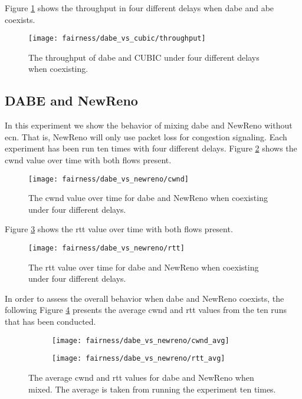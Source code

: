 Figure \ref{fig:dabe_and_cubic_throughput} shows the throughput in four different delays when \gls{dabe} and \gls{abe} coexists.

\begin{figure}[H]
    \centering
    \texttt{[image: fairness/dabe\_vs\_cubic/throughput]}
    \captionsetup{width=1.0\linewidth}
    \caption{The throughput of \gls{dabe} and CUBIC under four different delays when coexisting.}
    \label{fig:dabe_and_cubic_throughput}
\end{figure}






\subsection{DABE and NewReno}

In this experiment we show the behavior of mixing \gls{dabe} and NewReno without \gls{ecn}. That is, NewReno will only use packet loss for congestion signaling. Each experiment has been run ten times with four different delays. Figure \ref{fig:dabe_and_newreno_cwnd} shows the \gls{cwnd} value over time with both flows present.

\begin{figure}[H]
    \centering
    \texttt{[image: fairness/dabe\_vs\_newreno/cwnd]}
    \captionsetup{width=1.0\linewidth}
    \caption{The \gls{cwnd} value over time for \gls{dabe} and NewReno when coexisting under four different delays.}
    \label{fig:dabe_and_newreno_cwnd}
\end{figure}

Figure \ref{fig:dabe_and_newreno_rtt} shows the \gls{rtt} value over time with both flows present.

\begin{figure}[H]
    \centering
    \texttt{[image: fairness/dabe\_vs\_newreno/rtt]}
    \captionsetup{width=1.0\linewidth}
    \caption{The \gls{rtt} value over time for \gls{dabe} and NewReno when coexisting under four different delays.}
    \label{fig:dabe_and_newreno_rtt}
\end{figure}

In order to assess the overall behavior when \gls{dabe} and NewReno coexists, the following Figure \ref{fig:dabe_and_newreno_avg} presents the average \gls{cwnd} and \gls{rtt} values from the ten runs that has been conducted.

\begin{figure}[H]
    \centering
    \begin{subfigure}{0.5\linewidth}
        \centering
        \texttt{[image: fairness/dabe\_vs\_newreno/cwnd\_avg]}
    \end{subfigure}%
    \begin{subfigure}{0.5\linewidth}
        \centering
        \texttt{[image: fairness/dabe\_vs\_newreno/rtt\_avg]}
    \end{subfigure}
    \caption{The average \gls{cwnd} and \gls{rtt} values for \gls{dabe} and NewReno when mixed. The average is taken from running the experiment ten times.}
    \label{fig:dabe_and_newreno_avg}
\end{figure}


